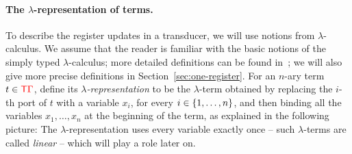 \paragraph*{The $\lambda$-representation of terms.} 
To describe the register updates in a transducer, we will use notions from $\lambda$-calculus.  
We assume that the reader is familiar with the basic notions of the simply typed $\lambda$-calculus; more detailed definitions can be found in~\cite{sorensen_lectures_2006}; we will also give more precise definitions in Section~\ref{sec:one-register}.
For an $n$-ary term $ t \in {\color{red}{\mathsf T}} {\color{red}{\Gamma}}$, define its \emph{$\lambda$-representation} to be the $\lambda$-term obtained by  replacing the  $i$-th port  of $t$ with a variable $x_i$, for every $i \in \{1,\ldots,n\}$, and then  binding all the  variables $x_1,\ldots,x_n$  at the beginning of the term, as explained in the following picture:
The $\lambda$-representation uses every variable exactly once -- such $\lambda$-terms are called \emph{linear} -- which will play a role later on.
